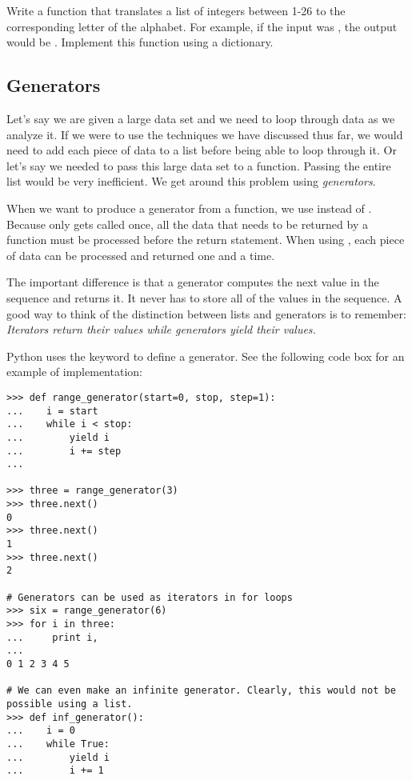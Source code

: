 \begin{problem}
Write a function that translates a list of integers between 1-26 to the corresponding letter of the alphabet. For example, if the input was \li{[1, 2, 3]}, the output would be \li{["a", "b", "c"]}. Implement this function using a dictionary. 
\end{problem}


\subsection*{Generators}

Let's say we are given a large data set and we need to loop through data as we analyze it. If we were to use the techniques we have discussed thus far, we would need to add each piece of data to a list before being able to loop through it. Or let's say we needed to pass this large data set to a function. Passing the entire list would be very inefficient. We get around this problem using \emph{generators}. 

When we want to produce a generator from a function, we use  instead of . Because  only gets called once, all the data that needs to be returned by a function must be processed before the return statement. When using , each piece of data can be processed and returned one and a time.

The important difference is that a generator computes the next value in the sequence and returns it. It never has to store all of the values in the sequence. A good way to think of the distinction between lists and generators is to remember: \emph{Iterators return their values while generators yield their values.}

Python uses the  keyword to define a generator. See the following code box for an example of implementation:

\begin{lstlisting}
>>> def range_generator(start=0, stop, step=1):
...    i = start
...    while i < stop:
...        yield i 
...        i += step
...

>>> three = range_generator(3)
>>> three.next()
0
>>> three.next()
1
>>> three.next()
2

# Generators can be used as iterators in for loops
>>> six = range_generator(6)
>>> for i in three:
...     print i,
...
0 1 2 3 4 5

# We can even make an infinite generator. Clearly, this would not be possible using a list.
>>> def inf_generator():
...    i = 0
...    while True:
...        yield i
...        i += 1

\end{lstlisting}

